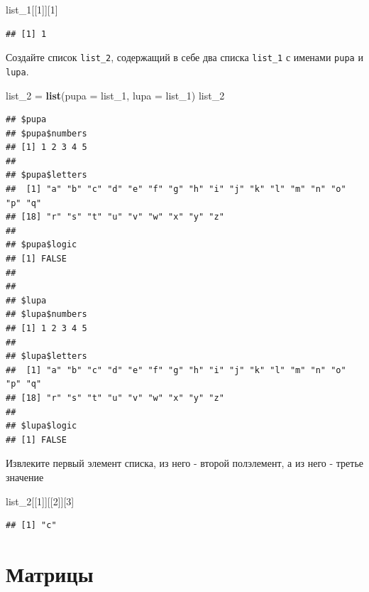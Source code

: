 \documentclass[]{book}
\newenvironment{Shaded}{\begin{snugshade}}{\end{snugshade}}
\newcommand{\DataTypeTok}[1]{\textcolor[rgb]{0.13,0.29,0.53}{#1}}
\newcommand{\DecValTok}[1]{\textcolor[rgb]{0.00,0.00,0.81}{#1}}
\newcommand{\KeywordTok}[1]{\textcolor[rgb]{0.13,0.29,0.53}{\textbf{#1}}}
\newcommand{\NormalTok}[1]{#1}
\newcommand{\StringTok}[1]{\textcolor[rgb]{0.31,0.60,0.02}{#1}}
\begin{document}
\begin{Shaded}
\begin{Highlighting}[]
\NormalTok{list_}\DecValTok{1}\NormalTok{[[}\DecValTok{1}\NormalTok{]][}\DecValTok{1}\NormalTok{]}
\end{Highlighting}
\end{Shaded}

\begin{verbatim}
## [1] 1
\end{verbatim}

Создайте список \texttt{list\_2}, содержащий в себе два списка \texttt{list\_1} с именами \texttt{pupa} и \texttt{lupa}.

\begin{Shaded}
\begin{Highlighting}[]
\NormalTok{list_}\DecValTok{2}\NormalTok{ =}\StringTok{ }\KeywordTok{list}\NormalTok{(}\DataTypeTok{pupa =}\NormalTok{ list_}\DecValTok{1}\NormalTok{, }\DataTypeTok{lupa =}\NormalTok{ list_}\DecValTok{1}\NormalTok{)}
\NormalTok{list_}\DecValTok{2}
\end{Highlighting}
\end{Shaded}

\begin{verbatim}
## $pupa
## $pupa$numbers
## [1] 1 2 3 4 5
## 
## $pupa$letters
##  [1] "a" "b" "c" "d" "e" "f" "g" "h" "i" "j" "k" "l" "m" "n" "o" "p" "q"
## [18] "r" "s" "t" "u" "v" "w" "x" "y" "z"
## 
## $pupa$logic
## [1] FALSE
## 
## 
## $lupa
## $lupa$numbers
## [1] 1 2 3 4 5
## 
## $lupa$letters
##  [1] "a" "b" "c" "d" "e" "f" "g" "h" "i" "j" "k" "l" "m" "n" "o" "p" "q"
## [18] "r" "s" "t" "u" "v" "w" "x" "y" "z"
## 
## $lupa$logic
## [1] FALSE
\end{verbatim}

Извлеките первый элемент списка, из него - второй полэлемент, а из него - третье значение

\begin{Shaded}
\begin{Highlighting}[]
\NormalTok{list_}\DecValTok{2}\NormalTok{[[}\DecValTok{1}\NormalTok{]][[}\DecValTok{2}\NormalTok{]][}\DecValTok{3}\NormalTok{]}
\end{Highlighting}
\end{Shaded}

\begin{verbatim}
## [1] "c"
\end{verbatim}

\hypertarget{solvt}{%
\section{Матрицы}\label{solvt}}
\end{document}
